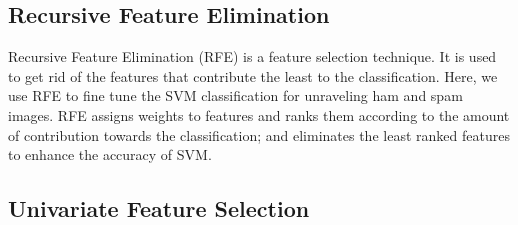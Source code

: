 \subsection{Recursive Feature Elimination}

Recursive Feature Elimination (RFE) is a feature selection technique. It is used to get rid of the features that contribute the least to the classification. Here, we use RFE to fine tune the SVM classification for unraveling ham and spam images. RFE assigns weights to features and ranks them according to the amount of contribution towards the classification; and eliminates the least ranked features to enhance the accuracy of SVM.

\subsection{Univariate Feature Selection}

